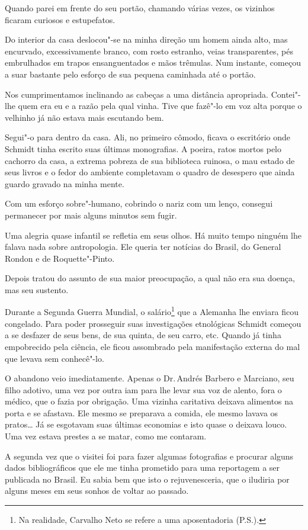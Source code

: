 Quando parei em frente do seu portão, chamando várias vezes, os vizinhos
ficaram curiosos e estupefatos.

Do interior da casa deslocou"-se na minha direção um homem ainda alto,
mas encurvado, excessivamente branco, com rosto estranho, veias
transparentes, pés embrulhados em trapos ensanguentados e mãos trêmulas.
Num instante, começou a suar bastante pelo esforço de sua pequena
caminhada até o portão.

Nos cumprimentamos inclinando as cabeças a uma distância apropriada.
Contei"-lhe quem era eu e a razão pela qual vinha. Tive que fazê"-lo em
voz alta porque o velhinho já não estava mais escutando bem.

Segui"-o para dentro da casa. Ali, no primeiro cômodo, ficava o
escritório onde Schmidt tinha escrito suas últimas monografias. A
poeira, ratos mortos pelo cachorro da casa, a extrema pobreza de sua
biblioteca ruinosa, o mau estado de seus livros e o fedor do ambiente
completavam o quadro de desespero que ainda guardo gravado na minha
mente.

Com um esforço sobre"-humano, cobrindo o nariz com um lenço, consegui
permanecer por mais alguns minutos sem fugir.

Uma alegria quase infantil se refletia em seus olhos. Há muito tempo
ninguém lhe falava nada sobre antropologia. Ele queria ter notícias do
Brasil, do General Rondon e de Roquette"-Pinto.

Depois tratou do assunto de sua maior preocupação, a qual não era sua
doença, mas seu sustento.

Durante a Segunda Guerra Mundial, o salário\footnote{Na realidade,
  Carvalho Neto se refere a uma aposentadoria (P.S.).} que a Alemanha
lhe enviara ficou congelado. Para poder prosseguir suas investigações
etnológicas Schmidt começou a se desfazer de seus bens, de sua quinta,
de seu carro, etc. Quando já tinha empobrecido pela ciência, ele ficou
assombrado pela manifestação externa do mal que levava sem conhecê"-lo.

O abandono veio imediatamente. Apenas o Dr.\,Andrés Barbero e Marciano,
seu filho adotivo, uma vez por outra iam para lhe levar sua voz de
alento, fora o médico, que o fazia por obrigação. Uma vizinha caritativa
deixava alimentos na porta e se afastava. Ele mesmo se preparava a
comida, ele mesmo lavava os pratos\ldots{} Já se esgotavam suas últimas
economias e isto quase o deixava louco. Uma vez estava prestes a se
matar, como me contaram.

A segunda vez que o visitei foi para fazer algumas fotografias e
procurar alguns dados bibliográficos que ele me tinha prometido para uma
reportagem a ser publicada no Brasil. Eu sabia bem que isto o
rejuvenesceria, que o iludiria por alguns meses em seus sonhos de voltar
ao passado.

